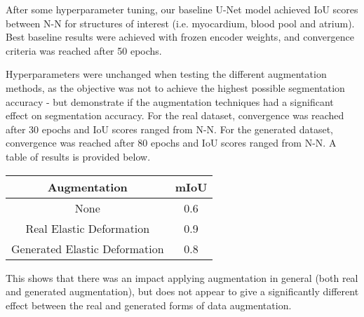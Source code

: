 After some hyperparameter tuning, our baseline U-Net model achieved IoU scores
between N-N for structures of interest (i.e. myocardium, blood
pool and atrium). Best baseline results were achieved with frozen encoder
weights, and convergence criteria was reached after 50 epochs.  \newline

Hyperparameters were unchanged when testing the different augmentation methods,
as the objective was not to achieve the highest possible segmentation accuracy -
but demonstrate if the augmentation techniques had a significant effect on
segmentation accuracy. For the real dataset, convergence was reached after 30
epochs and IoU scores ranged from N-N. For the generated dataset,
convergence was reached after 80 epochs and IoU scores ranged from N-N. A
table of results is provided below.
\newline

\begin{table}[h]
    \centering
    \begin{tabular}{|c|c|}
    \hline
    \textbf{Augmentation}         & \textbf{mIoU} \\ \hline
    None                          & 0.6           \\ \hline
    Real Elastic Deformation      & 0.9           \\ \hline
    Generated Elastic Deformation & 0.8           \\ \hline
    \end{tabular}
\end{table}

This shows that there was an impact applying augmentation in general (both real
and generated augmentation), but does not appear to give a significantly
different effect between the real and generated forms of data augmentation.
\newline